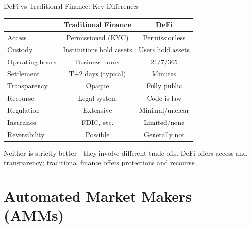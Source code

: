 \documentclass[10pt]{beamer}
\begin{document}
\begin{frame}{DeFi vs Traditional Finance: Key Differences}
  \begin{center}
  \begin{tabular}{lcc}
    \toprule
    & \textbf{Traditional Finance} & \textbf{DeFi} \\
    \midrule
    Access & Permissioned (KYC) & Permissionless \\
    Custody & Institutions hold assets & Users hold assets \\
    Operating hours & Business hours & 24/7/365 \\
    Settlement & T+2 days (typical) & Minutes \\
    Transparency & Opaque & Fully public \\
    Recourse & Legal system & Code is law \\
    \midrule
    Regulation & Extensive & Minimal/unclear \\
    Insurance & FDIC, etc. & Limited/none \\
    Reversibility & Possible & Generally not \\
    \bottomrule
  \end{tabular}
  \end{center}
  
  \vspace{0.5em}
  Neither is strictly better---they involve different trade-offs. DeFi offers access and transparency; traditional finance offers protections and recourse.
\end{frame}

\section{Automated Market Makers (AMMs)}
\end{document}
